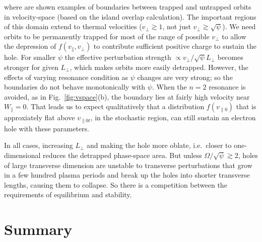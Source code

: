 \documentclass{agujournal2019}
\begin{document}
where are shown examples of boundaries between trapped and untrapped
orbits in velocity-space (based on the island overlap calculation).
The important regions of this domain extend to thermal velocities
($v_\perp\gtrsim 1$, not just $v_\perp \gtrsim \sqrt\psi$). We need
orbits to be permanently trapped for most of the range of possible
$v_\perp$ to allow the depression of $f(v_\parallel,v_\perp)$ to
contribute sufficient positive charge to sustain the hole. For smaller
$\psi$ the effective perturbation strength
$\propto v_\perp/ \sqrt{\psi}L_\perp$ becomes stronger for
given $L_\perp$, which makes orbits more easily detrapped. However,
the effects of varying resonance condition as $\psi$ changes are very
strong; so the boundaries do not behave monotonically with
$\psi$. When the $n=2$ resonance is avoided, as in Fig.\
\ref{fig:vspace}(b), the boundary lies at fairly high velocity near
$W_\parallel=0$. That leads us to expect qualitatively that a
distribution $f(v_{\parallel0})$ that is approxiately flat above
$v_{\parallel0t}$, in the stochastic region, can still sustain an
electron hole with these parameters.

In all cases, increasing $L_\perp$ and making the hole more oblate,
i.e.\ closer to one-dimensional reduces the detrapped phase-space
area. But unless $\Omega/\sqrt\psi\gtrsim 2$, holes of large
transverse dimension are unstable to transverse perturbations that
grow in a few hundred plasma periods and break up the holes into
shorter transverse lengths, causing them to collapse. So there is a
competition between the requirements of equilibrium and stability.


\section{Summary}
\end{document}
